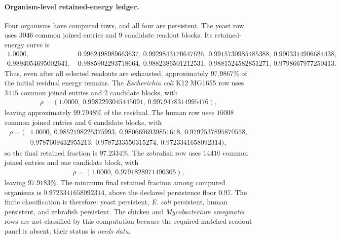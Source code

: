 \paragraph{Organism-level retained-energy ledger.}
Four organisms have computed rows, and all four are persistent.  The yeast row uses $3046$ common joined entries and $9$ candidate readout blocks.  Its retained-energy curve is
$$
\begin{aligned}
  1.0000,&\ 0.9962498989663637,\ 0.9929843170647626,\ 0.9915730985485388,\ 0.9903314906684438,\\
  0.9894054695002641,&\ 0.9885902293718664,\ 0.9882386501212531,\ 0.9881524582851271,\ 0.9798667977250413.
\end{aligned}
$$
Thus, even after all selected readouts are exhausted, approximately $97.9867\%$ of the initial residual energy remains.  The \emph{Escherichia coli} K12 MG1655 row uses $3415$ common joined entries and $2$ candidate blocks, with
$$
\begin{aligned}
  \rho = (1.0000,\ 0.9982293045445091,\ 0.9979478314995476),
\end{aligned}
$$
leaving approximately $99.7948\%$ of the residual.  The human row uses $16008$ common joined entries and $6$ candidate blocks, with
$$
\begin{aligned}
  \rho = (&1.0000,\ 0.9852198225375993,\ 0.9806696939851618,\ 0.9792537895870558,\\
          &0.9787609432955213,\ 0.9787233550315274,\ 0.9723341658092314),
\end{aligned}
$$
so the final retained fraction is $97.2334\%$.  The zebrafish row uses $14410$ common joined entries and one candidate block, with
$$
\begin{aligned}
  \rho=(1.0000,\ 0.9791828971490305),
\end{aligned}
$$
leaving $97.9183\%$.  The minimum final retained fraction among computed organisms is $0.9723341658092314$, above the declared persistence floor $0.97$.  The finite classification is therefore: yeast persistent, \emph{E. coli} persistent, human persistent, and zebrafish persistent.  The chicken and \emph{Mycobacterium smegmatis} rows are not classified by this computation because the required matched readout panel is absent; their status is \emph{needs data}.

